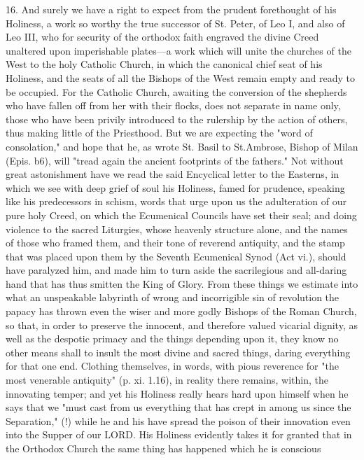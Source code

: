 16. And surely we have a right to expect from the prudent forethought of
his Holiness, a work so worthy the true successor of St. Peter, of Leo
I, and also of Leo III, who for security of the orthodox faith engraved
the divine Creed unaltered upon imperishable plates---a work which will
unite the churches of the West to the holy Catholic Church, in which the
canonical chief seat of his Holiness, and the seats of all the Bishops
of the West remain empty and ready to be occupied. For the Catholic
Church, awaiting the conversion of the shepherds who have fallen off
from her with their flocks, does not separate in name only, those who
have been privily introduced to the rulership by the action of others,
thus making little of the Priesthood. But we are expecting the "word of
consolation," and hope that he, as wrote St. Basil to St.Ambrose, Bishop
of Milan (Epis. b6), will "tread again the ancient footprints of the
fathers." Not without great astonishment have we read the said
Encyclical letter to the Easterns, in which we see with deep grief of
soul his Holiness, famed for prudence, speaking like his predecessors in
schism, words that urge upon us the adulteration of our pure holy Creed,
on which the Ecumenical Councils have set their seal; and doing violence
to the sacred Liturgies, whose heavenly structure alone, and the names
of those who framed them, and their tone of reverend antiquity, and the
stamp that was placed upon them by the Seventh Ecumenical Synod (Act
vi.), should have paralyzed him, and made him to turn aside the
sacrilegious and all-daring hand that has thus smitten the King of
Glory. From these things we estimate into what an unspeakable labyrinth
of wrong and incorrigible sin of revolution the papacy has thrown even
the wiser and more godly Bishops of the Roman Church, so that, in order
to preserve the innocent, and therefore valued vicarial dignity, as well
as the despotic primacy and the things depending upon it, they know no
other means shall to insult the most divine and sacred things, daring
everything for that one end. Clothing themselves, in words, with pious
reverence for "the most venerable antiquity" (p. xi. 1.16), in reality
there remains, within, the innovating temper; and yet his Holiness
really hears hard upon himself when he says that we "must cast from us
everything that has crept in among us since the Separation," (!) while
he and his have spread the poison of their innovation even into the
Supper of our LORD. His Holiness evidently takes it for granted that in
the Orthodox Church the same thing has happened which he is conscious
